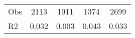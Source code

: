 \begin{tabular}{l*{4}{c}}
\hline                                                                                                                                                                                                                                            
 Obs                   &               2113               &       1911                       &       1374                &              2699                                               \\ 
 R2                    &                      0.032              &              0.003                      &              0.043               &                     0.033                                              \\ 
\hline \end{tabular}                                                                                                                                                                                                              